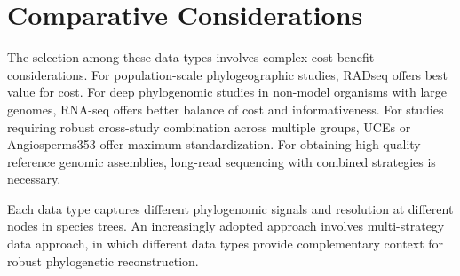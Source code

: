 \textcite{fan2015, dylus2024, balaban2025}

\section{Comparative Considerations}

The selection among these data types involves complex cost-benefit considerations. For population-scale phylogeographic studies, RADseq offers best value for cost. For deep phylogenomic studies in non-model organisms with large genomes, RNA-seq offers better balance of cost and informativeness. For studies requiring robust cross-study combination across multiple groups, UCEs or Angiosperms353 offer maximum standardization. For obtaining high-quality reference genomic assemblies, long-read sequencing with combined strategies is necessary.

Each data type captures different phylogenomic signals and resolution at different nodes in species trees. An increasingly adopted approach involves multi-strategy data approach, in which different data types provide complementary context for robust phylogenetic reconstruction.

